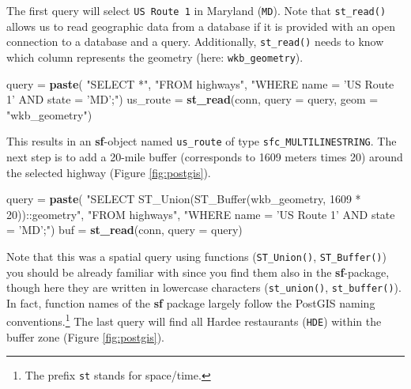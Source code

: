 \documentclass[]{krantz}
\newenvironment{Shaded}{\begin{snugshade}}{\end{snugshade}}
\newcommand{\DataTypeTok}[1]{\textcolor[rgb]{0.27,0.27,0.27}{#1}}
\newcommand{\KeywordTok}[1]{\textcolor[rgb]{0.27,0.27,0.27}{\textbf{#1}}}
\newcommand{\NormalTok}[1]{#1}
\newcommand{\StringTok}[1]{\textcolor[rgb]{0.5,0.5,0.5}{#1}}
\let\rmarkdownfootnote\footnote%
\def\footnote{\protect\rmarkdownfootnote}
\begin{document}
The first query will select \texttt{US\ Route\ 1} in Maryland (\texttt{MD}).
Note that \texttt{st\_read()} allows us to read geographic data from a database if it is provided with an open connection to a database and a query.
Additionally, \texttt{st\_read()} needs to know which column represents the geometry (here: \texttt{wkb\_geometry}).

\begin{Shaded}
\begin{Highlighting}[]
\NormalTok{query =}\StringTok{ }\KeywordTok{paste}\NormalTok{(}
  \StringTok{"SELECT *"}\NormalTok{,}
  \StringTok{"FROM highways"}\NormalTok{,}
  \StringTok{"WHERE name = 'US Route 1' AND state = 'MD';"}\NormalTok{)}
\NormalTok{us_route =}\StringTok{ }\KeywordTok{st_read}\NormalTok{(conn, }\DataTypeTok{query =}\NormalTok{ query, }\DataTypeTok{geom =} \StringTok{"wkb_geometry"}\NormalTok{)}
\end{Highlighting}
\end{Shaded}

This results in an \textbf{sf}-object named \texttt{us\_route} of type \texttt{sfc\_MULTILINESTRING}.
The next step is to add a 20-mile buffer (corresponds to 1609 meters times 20) around the selected highway (Figure \ref{fig:postgis}).

\begin{Shaded}
\begin{Highlighting}[]
\NormalTok{query =}\StringTok{ }\KeywordTok{paste}\NormalTok{(}
  \StringTok{"SELECT ST_Union(ST_Buffer(wkb_geometry, 1609 * 20))::geometry"}\NormalTok{,}
  \StringTok{"FROM highways"}\NormalTok{,}
  \StringTok{"WHERE name = 'US Route 1' AND state = 'MD';"}\NormalTok{)}
\NormalTok{buf =}\StringTok{ }\KeywordTok{st_read}\NormalTok{(conn, }\DataTypeTok{query =}\NormalTok{ query)}
\end{Highlighting}
\end{Shaded}

Note that this was a spatial query using functions (\texttt{ST\_Union()}, \texttt{ST\_Buffer()}) you should be already familiar with since you find them also in the \textbf{sf}-package, though here they are written in lowercase characters (\texttt{st\_union()}, \texttt{st\_buffer()}).
In fact, function names of the \textbf{sf} package largely follow the PostGIS naming conventions.\footnote{The prefix \texttt{st} stands for space/time.}
The last query will find all Hardee restaurants (\texttt{HDE}) within the buffer zone (Figure \ref{fig:postgis}).
\end{document}
